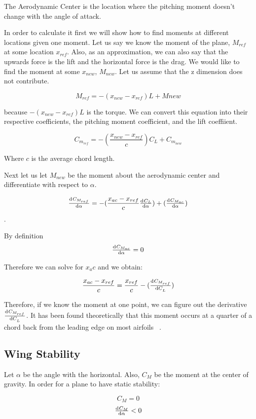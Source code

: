 The Aerodynamic Center is the location where the pitching moment doesn't
change with the angle of attack. 

In order to calculate it first we will show how to 
find moments at different locations given one moment. 
Let us say we know the moment of the plane, $M_{ref}$ at some
location $x_{ref}$. Also, as an approximation, we can also say that the upwards force
is the lift and the horizontal force is the drag. We would like to find the moment
at some $x_{new}$, $M_{new}$. Let us assume that the z dimension does not contribute.

\[M_{ref} = -(x_{new} - x_{ref})L + M{new} \] 

because $-(x_{new} - x_{ref})L$ is the torque. We can convert this equation into their
respective coefficients, the pitching moment coefficient, and the lift coeffiient.

\[C_{m_{ref}} = - ( \frac{x_{new} - x_{ref}}{c})C_L + C_{m_{new}} \]

Where $c$ is the average chord length.

Next let us let $M_{new}$ be the moment about the aerodynamic center and
differentiate with respect to $\alpha$.

\[\od{C_{M_{ref}}}{\alpha} = - (\frac{x_{ac} - x_{ref}}{c}\od{C_L}{\alpha}) + (\od{C_{M_{ac}}}{\alpha})\].

By definition 
\[\od{C_{M_{ac}}}{\alpha} = 0\]

Therefore we can solve for $x_ac$ and we obtain:

\[\frac{x_{ac} - x_{ref}}{c} = \frac{x_{ref}}{c} - (\od{C_{M_{ref}}}{C_L})\]

Therefore, if we know the moment at one point, we can figure out the derivative 
$\od{C_{M_{ref}}}{C_L}$. It has been found theoretically that this moment
occurs at a quarter of a chord back from the leading edge on most airfoils ~\cite{NASAac}.



\subsection{Wing Stability}
Let $\alpha$ be the angle with the horizontal. Also,
$C_M$ be the moment at the center of gravity.  In order for a plane to have static
stability:

\begin{equation}
C_M = 0
\end{equation}
\begin{equation}
\od{C_M}{\alpha} < 0
\label{eq:long_stability}
\end{equation}

